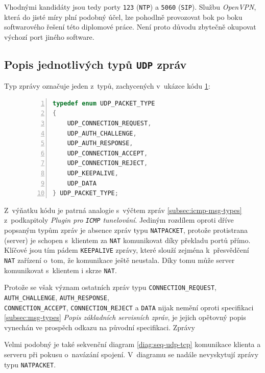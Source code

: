 \documentclass[thesis=M,czech]{FITthesis}[2012/10/20]
\begin{document}
Vhodnými kandidáty jsou tedy porty \texttt{123} (\texttt{NTP}) a \texttt{5060} (\texttt{SIP}). Službu \mbox{\textit{OpenVPN}}, která do jisté míry plní podobný účel, lze pohodlně provozovat bok po boku softwarového řešení této diplomové práce. Není proto důvodu zbytečně okupovat výchozí port jiného software.
    
    \subsection{Popis jednotlivých typů \texttt{UDP} zpráv}
        
    Typ zprávy označuje jeden z~typů, zachycených v~ukázce kódu \ref{code:udp-types}:
        
    \begin{figure}[h]
	\begin{lstlisting}[caption=Výňatek souboru \texttt{plugins/udp/packet.h} definující typy \texttt{UDP} zpráv,language=c,frame=single,numbers=left]
typedef enum UDP_PACKET_TYPE
{
	UDP_CONNECTION_REQUEST,
	UDP_AUTH_CHALLENGE,
	UDP_AUTH_RESPONSE,
	UDP_CONNECTION_ACCEPT,
	UDP_CONNECTION_REJECT,
	UDP_KEEPALIVE,
	UDP_DATA
} UDP_PACKET_TYPE;
      \end{lstlisting}
      \label{code:udp-types}
    \end{figure}

    Z~výňatku kódu je patrná analogie s~výčtem zpráv \ref{subsec:icmp-msg-types} z~podkapitoly \textit{Plugin pro \texttt{ICMP} tunelování}. Jediným rozdílem oproti dříve popsaným typům zpráv je absence zpráv typu \texttt{NATPACKET}, protože protistrana (server) je schopen s~klientem za \texttt{NAT} komunikovat díky překladu portů přímo. Klíčové jsou tím pádem \texttt{KEEPALIVE} zprávy, které slouží zejména k~přesvědčení \texttt{NAT} zařízení o~tom, že komunikace ještě neustala. Díky tomu může server komunikovat s~klientem i skrze \texttt{NAT}.
    
    Protože se však význam ostatních zpráv typu \texttt{CONNECTION\_REQUEST}, \texttt{AUTH\_CHALLENGE}, \texttt{AUTH\_RESPONSE},\\ \texttt{CONNECTION\_ACCEPT}, \texttt{CONNECTION\_REJECT} a \texttt{DATA} nijak nemění oproti specifikaci \ref{subsec:msg-types} \textit{Popis základních servisních zpráv}, je jejich opětovný popis vynechán ve prospěch odkazu na původní specifikaci.
     Zprávy 

    Velmi podobný je také sekvenční diagram \ref{diag:seq-udp-tcp} komunikace klienta a serveru při pokusu o~navázání spojení. V~diagramu se nadále nevyskytují zprávy typu \texttt{NATPACKET}.
    
\end{document}
